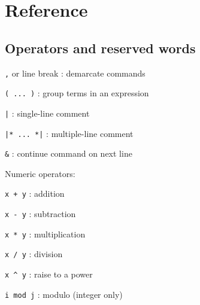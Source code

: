 \documentclass{article}
\begin{document}
\newpage



\section{Reference}




\subsection{Operators and reserved words}   

\small

\noindent
\begin{description}
\item{\verb#,# or line break} :  demarcate commands
\item{\verb#( ... )#} :  group terms in an expression
\item{\verb#|#} :  single-line comment
\item{\verb#|* ... *|#} :  multiple-line comment
\item{\verb#&#} :  continue command on next line\\
\end{description}

\noindent
Numeric operators:
\begin{description}
\item{\verb#x + y#} :  addition
\item{\verb#x - y#} :  subtraction
\item{\verb#x * y#} :  multiplication
\item{\verb#x / y#} :  division
\item{\verb#x ^ y#} :  raise to a power
\item{\verb#i mod j#} :  modulo (integer only)\\
\end{description}
\end{document}
